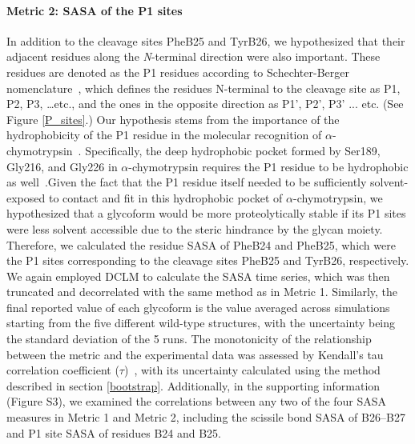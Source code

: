 \documentclass[sn-vancouver]{sn-jnl}
\begin{document}
\paragraph{Metric 2: SASA of the P1 sites}
In addition to the cleavage sites PheB25 and TyrB26, we hypothesized that their adjacent residues along the \emph{N}-terminal direction were also important. These residues are denoted as the P1 residues according to Schechter-Berger nomenclature~\cite{schechter1968active}, which defines the residues N-terminal to the cleavage site as P1, P2, P3, \ldots etc., and the ones in the opposite direction as P1', P2', P3' ... etc. (See Figure \ref{P_sites}.) Our hypothesis stems from the importance of the hydrophobicity of the P1 residue in the molecular recognition of $\alpha$-chymotrypsin~\cite{appel1986chymotrypsin}. Specifically, the deep hydrophobic pocket formed by Ser189, Gly216, and Gly226 in $\alpha$-chymotrypsin requires the P1 residue to be hydrophobic as well~\cite{hedstrom2002serine}.Given the fact that the P1 residue itself needed to be sufficiently solvent-exposed to contact and fit in this hydrophobic pocket of $\alpha$-chymotrypsin, we hypothesized that a glycoform would be more proteolytically stable if its P1 sites were less solvent accessible due to the steric hindrance by the glycan moiety. Therefore, we calculated the residue SASA of PheB24 and PheB25, which were the P1 sites corresponding to the cleavage sites PheB25 and TyrB26, respectively. We again employed DCLM to calculate the SASA time series, which was then truncated and decorrelated with the same method as in Metric 1. Similarly, the final reported value of each glycoform is the value averaged across simulations starting from the five different wild-type structures, with the uncertainty being the standard deviation of the 5 runs. The monotonicity of the relationship between the metric and the experimental data was assessed by Kendall's tau correlation coefficient ($\tau$)~\cite{kendall1948advanced}, with its uncertainty calculated using the method described in section \ref{bootstrap}. Additionally, in the supporting information (Figure S3), we examined the correlations between any two of the four SASA measures in Metric 1 and Metric 2, including the scissile bond SASA of B26--B27 and P1 site SASA of residues B24 and B25. 
\end{document}
